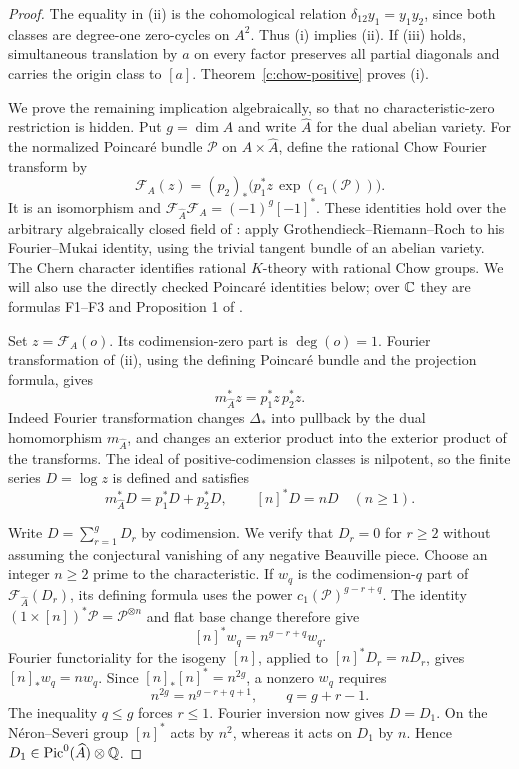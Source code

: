 \begin{proof}
The equality in (ii) is the cohomological relation $\delta_{12}y_1=y_1y_2$, since both classes are degree-one zero-cycles on $A^2$. Thus (i) implies (ii). If (iii) holds, simultaneous translation by $a$ on every factor preserves all partial diagonals and carries the origin class to $[a]$. Theorem~\ref{c:chow-positive} proves (i).

We prove the remaining implication algebraically, so that no characteristic-zero restriction is hidden. Put $g=\dim A$ and write $\widehat A$ for the dual abelian variety. For the normalized Poincar\'e bundle $\mathcal P$ on $A\times\widehat A$, define the rational Chow Fourier transform by
\[
 \mathcal F_A(z)=(p_2)_*\bigl(p_1^*z\,\exp(c_1(\mathcal P))\bigr).
\]
It is an isomorphism and $\mathcal F_{\widehat A}\mathcal F_A=(-1)^g[-1]^*$. These identities hold over the arbitrary algebraically closed field of \citet[Theorem 2.2, p.~156, with the field convention on p.~154]{c_mukai1981}: apply Grothendieck--Riemann--Roch to his Fourier--Mukai identity, using the trivial tangent bundle of an abelian variety. The Chern character identifies rational $K$-theory with rational Chow groups. We will also use the directly checked Poincar\'e identities below; over $\mathbb C$ they are formulas F1--F3 and Proposition 1 of \citet[pp.~647--648]{c_beauville1986}.

Set $z=\mathcal F_A(o)$. Its codimension-zero part is $\deg(o)=1$. Fourier transformation of (ii), using the defining Poincar\'e bundle and the projection formula, gives
\[
 m_{\widehat A}^*z=p_1^*z\,p_2^*z.
\]
Indeed Fourier transformation changes $\Delta_*$ into pullback by the dual homomorphism $m_{\widehat A}$, and changes an exterior product into the exterior product of the transforms. The ideal of positive-codimension classes is nilpotent, so the finite series $D=\log z$ is defined and satisfies
\[
 m_{\widehat A}^*D=p_1^*D+p_2^*D,
 \qquad [n]^*D=nD\quad(n\geq1).
\]

Write $D=\sum_{r=1}^gD_r$ by codimension. We verify that $D_r=0$ for $r\geq2$ without assuming the conjectural vanishing of any negative Beauville piece. Choose an integer $n\geq2$ prime to the characteristic. If $w_q$ is the codimension-$q$ part of $\mathcal F_{\widehat A}(D_r)$, its defining formula uses the power $c_1(\mathcal P)^{g-r+q}$. The identity $(1\times[n])^*\mathcal P=\mathcal P^{\otimes n}$ and flat base change therefore give
\[
 [n]^*w_q=n^{g-r+q}w_q.
\]
Fourier functoriality for the isogeny $[n]$, applied to $[n]^*D_r=nD_r$, gives $[n]_*w_q=nw_q$. Since $[n]_*[n]^*=n^{2g}$, a nonzero $w_q$ requires
\[
 n^{2g}=n^{g-r+q+1},\qquad q=g+r-1.
\]
The inequality $q\leq g$ forces $r\leq1$. Fourier inversion now gives $D=D_1$. On the N\'eron--Severi group $[n]^*$ acts by $n^2$, whereas it acts on $D_1$ by $n$. Hence $D_1\in\operatorname{Pic}^0(\widehat A)\otimes\mathbb Q$.


\end{proof}
